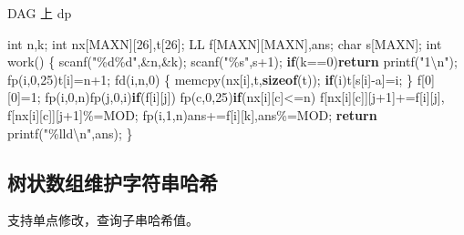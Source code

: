 \documentclass[
]{article}
\newenvironment{Shaded}{}{}
\newcommand{\CharTok}[1]{\textcolor[rgb]{0.25,0.44,0.63}{#1}}
\newcommand{\ControlFlowTok}[1]{\textcolor[rgb]{0.00,0.44,0.13}{\textbf{#1}}}
\newcommand{\DataTypeTok}[1]{\textcolor[rgb]{0.56,0.13,0.00}{#1}}
\newcommand{\DecValTok}[1]{\textcolor[rgb]{0.25,0.63,0.44}{#1}}
\newcommand{\KeywordTok}[1]{\textcolor[rgb]{0.00,0.44,0.13}{\textbf{#1}}}
\newcommand{\NormalTok}[1]{#1}
\newcommand{\SpecialCharTok}[1]{\textcolor[rgb]{0.25,0.44,0.63}{#1}}
\newcommand{\StringTok}[1]{\textcolor[rgb]{0.25,0.44,0.63}{#1}}
\begin{document}
DAG 上 dp

\begin{Shaded}
\begin{Highlighting}[]
\DataTypeTok{int}\NormalTok{ n,k;}
\DataTypeTok{int}\NormalTok{ nx[MAXN][}\DecValTok{26}\NormalTok{],t[}\DecValTok{26}\NormalTok{];}
\NormalTok{LL f[MAXN][MAXN],ans;}
\DataTypeTok{char}\NormalTok{ s[MAXN];}
\DataTypeTok{int}\NormalTok{ work()}
\NormalTok{\{}
\NormalTok{    scanf(}\StringTok{"}\SpecialCharTok{\%d\%d}\StringTok{"}\NormalTok{,\&n,\&k);    }
\NormalTok{    scanf(}\StringTok{"}\SpecialCharTok{\%s}\StringTok{"}\NormalTok{,s+}\DecValTok{1}\NormalTok{);}
    \ControlFlowTok{if}\NormalTok{(k==}\DecValTok{0}\NormalTok{)}\ControlFlowTok{return}\NormalTok{ printf(}\StringTok{"1}\SpecialCharTok{\textbackslash{}n}\StringTok{"}\NormalTok{);}
\NormalTok{    fp(i,}\DecValTok{0}\NormalTok{,}\DecValTok{25}\NormalTok{)t[i]=n+}\DecValTok{1}\NormalTok{;}
\NormalTok{    fd(i,n,}\DecValTok{0}\NormalTok{)}
\NormalTok{    \{}
\NormalTok{        memcpy(nx[i],t,}\KeywordTok{sizeof}\NormalTok{(t));}
        \ControlFlowTok{if}\NormalTok{(i)t[s[i]{-}}\CharTok{\textquotesingle{}a\textquotesingle{}}\NormalTok{]=i;}
\NormalTok{    \}}
\NormalTok{    f[}\DecValTok{0}\NormalTok{][}\DecValTok{0}\NormalTok{]=}\DecValTok{1}\NormalTok{;}
\NormalTok{    fp(i,}\DecValTok{0}\NormalTok{,n)fp(j,}\DecValTok{0}\NormalTok{,i)}\ControlFlowTok{if}\NormalTok{(f[i][j])}
\NormalTok{        fp(c,}\DecValTok{0}\NormalTok{,}\DecValTok{25}\NormalTok{)}\ControlFlowTok{if}\NormalTok{(nx[i][c]\textless{}=n)}
\NormalTok{            f[nx[i][c]][j+}\DecValTok{1}\NormalTok{]+=f[i][j],}
\NormalTok{            f[nx[i][c]][j+}\DecValTok{1}\NormalTok{]\%=MOD;}
\NormalTok{    fp(i,}\DecValTok{1}\NormalTok{,n)ans+=f[i][k],ans\%=MOD;}
    \ControlFlowTok{return}\NormalTok{ printf(}\StringTok{"}\SpecialCharTok{\%lld\textbackslash{}n}\StringTok{"}\NormalTok{,ans);}
\NormalTok{\}}
\end{Highlighting}
\end{Shaded}

\hypertarget{ux6811ux72b6ux6570ux7ec4ux7ef4ux62a4ux5b57ux7b26ux4e32ux54c8ux5e0c}{%
\subsection{树状数组维护字符串哈希}\label{ux6811ux72b6ux6570ux7ec4ux7ef4ux62a4ux5b57ux7b26ux4e32ux54c8ux5e0c}}

支持单点修改，查询子串哈希值。
\end{document}
